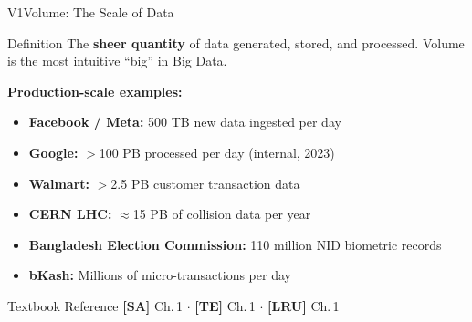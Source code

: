 \documentclass[aspectratio=169,10pt]{beamer}
\begin{document}
\begin{frame}{V1\textemdash Volume: The Scale of Data}
      \begin{block}{Definition}
        The \textbf{sheer quantity} of data generated, stored, and processed.  Volume is the most intuitive ``big'' in Big Data.
      \end{block}
      \vspace{6pt}
      \textbf{Production-scale examples:}
      \begin{itemize}
        \item \textbf{Facebook / Meta:} 500 TB new data ingested per day
        \item \textbf{Google:} $>$100 PB processed per day (internal, 2023)
        \item \textbf{Walmart:} $>$2.5 PB customer transaction data
        \item \textbf{CERN LHC:} $\approx$15 PB of collision data per year
        \item \textbf{Bangladesh Election Commission:} 110 million NID biometric records
        \item \textbf{bKash:} Millions of micro-transactions per day
      \end{itemize}
      \vspace{4pt}
      \begin{exampleblock}{Textbook Reference}
        \textbf{[SA]} Ch.\,1 $\cdot$ \textbf{[TE]} Ch.\,1 $\cdot$ \textbf{[LRU]} Ch.\,1
      \end{exampleblock}

\end{frame}
\end{document}
